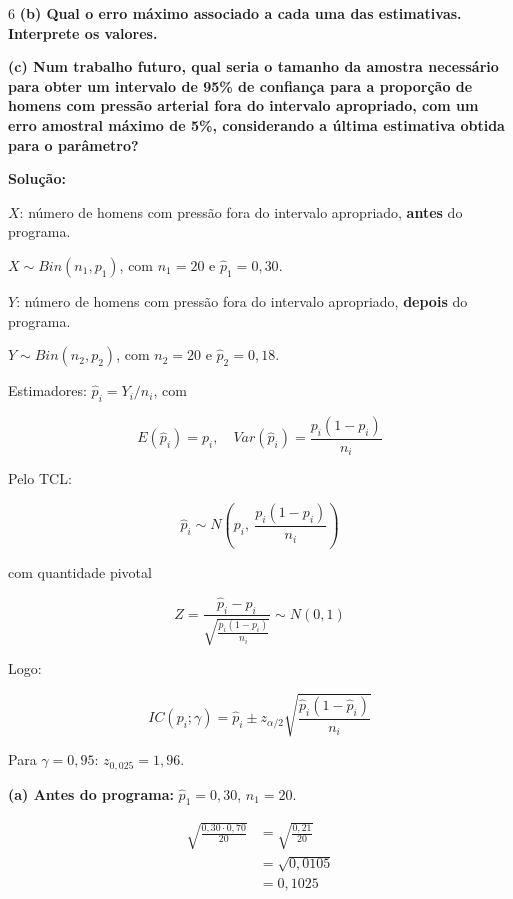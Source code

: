 \documentclass[8pt, a4paper, landscape]{extarticle}
\begin{document}
\begin{multicols}{6}
\textbf{(b) Qual o erro máximo associado a cada uma das estimativas. Interprete os valores.}

\textbf{(c) Num trabalho futuro, qual seria o tamanho da amostra necessário para obter um intervalo de 95\% de confiança para a proporção de homens com pressão arterial fora do intervalo apropriado, com um erro amostral máximo de 5\%, considerando a última estimativa obtida para o parâmetro?}

\vspace{0.3cm}

\textbf{Solução:}

$X$: número de homens com pressão fora do intervalo apropriado, \textbf{antes} do programa.

$X \sim Bin(n_1, p_1)$, com $n_1 = 20$ e $\hat{p}_1 = 0,30$.

$Y$: número de homens com pressão fora do intervalo apropriado, \textbf{depois} do programa.

$Y \sim Bin(n_2, p_2)$, com $n_2 = 20$ e $\hat{p}_2 = 0,18$.

Estimadores: $\hat{p}_i = Y_i/n_i$, com

\begin{equation*}
E(\hat{p}_i) = p_i, \quad Var(\hat{p}_i) = \frac{p_i(1-p_i)}{n_i}
\end{equation*}

Pelo TCL:

\begin{equation*}
\hat{p}_i \sim N\left(p_i,\ \frac{p_i(1-p_i)}{n_i}\right)
\end{equation*}

com quantidade pivotal

\begin{equation*}
Z = \frac{\hat{p}_i - p_i}{\sqrt{\frac{p_i(1-p_i)}{n_i}}} \sim N(0,1)
\end{equation*}

Logo:

\begin{equation*}
IC(p_i;\gamma) = \hat{p}_i \pm z_{\alpha/2}\sqrt{\frac{\hat{p}_i(1-\hat{p}_i)}{n_i}}
\end{equation*}

Para $\gamma = 0,95$: $z_{0,025} = 1,96$.

\vspace{0.2cm}

\textbf{(a) Antes do programa:} $\hat{p}_1 = 0,30$, $n_1 = 20$.

\begin{equation*}
\begin{split}
\sqrt{\frac{0,30 \cdot 0,70}{20}} &= \sqrt{\frac{0,21}{20}} \\
&= \sqrt{0,0105} \\
&= 0,1025
\end{split}
\end{equation*}


\end{multicols}
\end{document}
